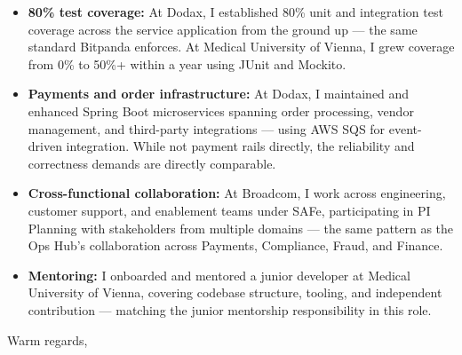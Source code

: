 \documentclass[]{cover}
\begin{document}

\vspace{6pt}






{\raggedright{}\fontsize{11pt}{13pt}\selectfont
\begin{itemize}
  \item \textbf{80\% test coverage:} At Dodax, I established 80\% unit and integration test coverage across the service application from the ground up — the same standard Bitpanda enforces. At Medical University of Vienna, I grew coverage from 0\% to 50\%+ within a year using JUnit and Mockito.
  \item \textbf{Payments and order infrastructure:} At Dodax, I maintained and enhanced Spring Boot microservices spanning order processing, vendor management, and third-party integrations — using AWS SQS for event-driven integration. While not payment rails directly, the reliability and correctness demands are directly comparable.
  \item \textbf{Cross-functional collaboration:} At Broadcom, I work across engineering, customer support, and enablement teams under SAFe, participating in PI Planning with stakeholders from multiple domains — the same pattern as the Ops Hub's collaboration across Payments, Compliance, Fraud, and Finance.
  \item \textbf{Mentoring:} I onboarded and mentored a junior developer at Medical University of Vienna, covering codebase structure, tooling, and independent contribution — matching the junior mentorship responsibility in this role.
\end{itemize}\par}



\closing{Warm regards,}

\signature{Meenakshi Subudhi}
\end{document}
